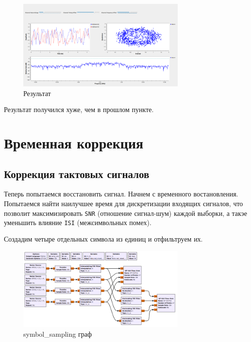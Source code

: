 \documentclass[a4paper,12pt]{article}
\begin{document}
	\begin{figure}[H]
		\centering
		\includegraphics[width=0.75\textwidth]{2_2.png}
		\caption{Результат}
		\label{fig:2.2}
	\end{figure}
	
	Результат получился хуже, чем в прошлом пункте.
	
	\newpage
	
	\section{Временная коррекция}
	
	\subsection{Коррекция тактовых сигналов}
	
	Теперь попытаемся восстановить сигнал. Начнем с временного востановления. Попытаемся найти наилучшее время для дискретизации входящих сигналов, что позволит максимизировать \texttt{SNR} (отношение сигнал-шум) каждой выборки, а такэе уменьшить влияние \texttt{ISI} (межсимвольных помех). 
	
	Создадим четыре отдельных символа из единиц и отфильтруем их.
	
	\begin{figure}[H]
		\centering
		\includegraphics[width=0.75\textwidth]{3_1.png}
		\caption{symbol\_sampling граф}
		\label{fig:3.1}
	\end{figure}
\end{document}
